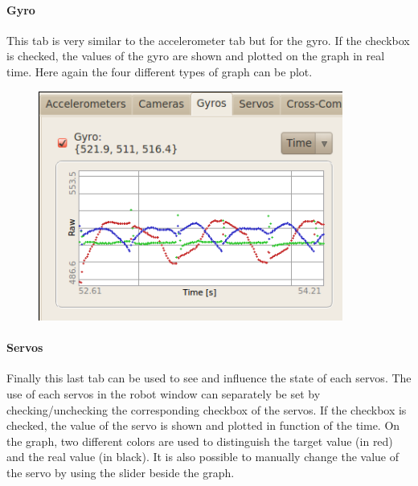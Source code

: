 \documentclass[a4paper, 12pt]{article}  		%
\begin{document}
\paragraph*{Gyro}
This tab is very similar to the accelerometer tab but for the gyro. If the checkbox is checked, the values of the gyro are shown and plotted on the graph in real time. Here again the four different types of graph can be plot. \\

\begin{figure}[H]
\begin{center}
\includegraphics[width=10cm]{window_gyro.png}
\label{window_gyro}
\end{center}
\end{figure}

\newpage
\paragraph*{Servos}
Finally this last tab can be used to see and influence the state of each servos. The use of each servos in the robot window can separately be set by checking/unchecking the corresponding checkbox of the servos. If the checkbox is checked, the value of the servo is shown and plotted in function of the time. On the graph, two different colors are used to distinguish the target value (in red) and the real value (in black). It is also possible to manually change the value of the servo by using the slider beside the graph.\\
\end{document}
